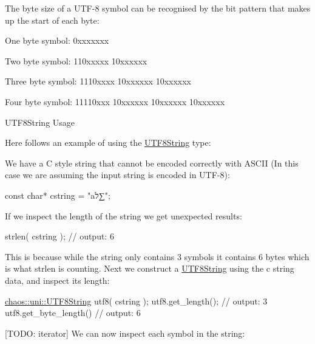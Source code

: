 The byte size of a U\+T\+F-\/8 symbol can be recognised by the bit pattern that makes up the start of each byte\+:


\begin{DoxyItemize}
\item One byte symbol\+: {\ttfamily 0xxxxxxx}
\item Two byte symbol\+: {\ttfamily 110xxxxx 10xxxxxx}
\item Three byte symbol\+: {\ttfamily 1110xxxx 10xxxxxx 10xxxxxx}
\item Four byte symbol\+: {\ttfamily 11110xxx 10xxxxxx 10xxxxxx 10xxxxxx}
\end{DoxyItemize}

\begin{DoxyParagraph}{U\+T\+F8\+String Usage}

\end{DoxyParagraph}
Here follows an example of using the \hyperlink{classchaos_1_1uni_1_1_u_t_f8_string}{U\+T\+F8\+String} type\+:

We have a C style string that cannot be encoded correctly with A\+S\+C\+I\+I (In this case we are assuming the input string is encoded in U\+T\+F-\/8)\+:


\begin{DoxyCode}
\textcolor{keyword}{const} \textcolor{keywordtype}{char}* cstring = \textcolor{stringliteral}{"aל∑"};
\end{DoxyCode}


If we inspect the length of the string we get unexpected results\+:


\begin{DoxyCode}
strlen( cstring );
\textcolor{comment}{// output: 6}
\end{DoxyCode}


This is because while the string only contains 3 symbols it contains 6 bytes which is what {\ttfamily strlen} is counting. Next we construct a \hyperlink{classchaos_1_1uni_1_1_u_t_f8_string}{U\+T\+F8\+String} using the c string data, and inspect it\textquotesingle{}s length\+:


\begin{DoxyCode}
\hyperlink{classchaos_1_1uni_1_1_u_t_f8_string}{chaos::uni::UTF8String} utf8( cstring );
utf8.get\_length();
\textcolor{comment}{// output: 3}
utf8.get\_byte\_length()
\textcolor{comment}{// output: 6}
\end{DoxyCode}


\mbox{[}T\+O\+D\+O\+: iterator\mbox{]} We can now inspect each symbol in the string\+:



